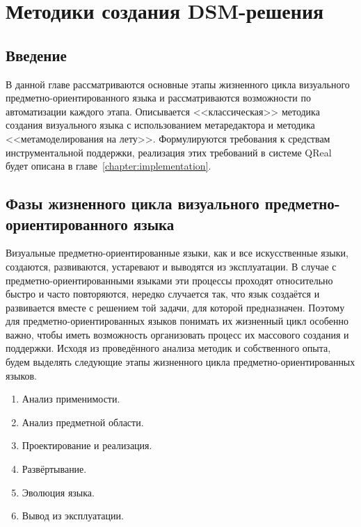 \chapter{Методики создания DSM-решения}

\section{Введение}
В данной главе рассматриваются основные этапы жизненного цикла визуального предметно-ориентированного 
языка и рассматриваются возможности по автоматизации каждого этапа. Описывается <<классическая>> 
методика создания визуального языка с использованием метаредактора и методика 
<<метамоделирования на лету>>. Формулируются требования к средствам инструментальной 
поддержки, реализация этих требований в системе QReal будет описана в главе~\ref{chapter:implementation}.

\section{Фазы жизненного цикла визуального предметно-ориентированного языка}
Визуальные предметно-ориентированные языки, как и все искусственные языки, создаются, 
развиваются, устаревают и выводятся из эксплуатации. В случае с предметно-ориентированными 
языками эти процессы проходят относительно быстро и часто повторяются, нередко случается 
так, что язык создаётся и развивается вместе с решением той задачи, для которой предназначен. 
Поэтому для предметно-ориентированных языков понимать их жизненный цикл особенно важно, 
чтобы иметь возможность организовать процесс их массового создания и поддержки. Исходя 
из проведённого анализа методик и собственного опыта, будем выделять следующие этапы жизненного 
цикла предметно-ориентированных языков.

\begin{enumerate}
	\item Анализ применимости. 
	\item Анализ предметной области.
	\item Проектирование и реализация.
	\item Развёртывание.
	\item Эволюция языка.
	\item Вывод из эксплуатации.
\end{enumerate}

